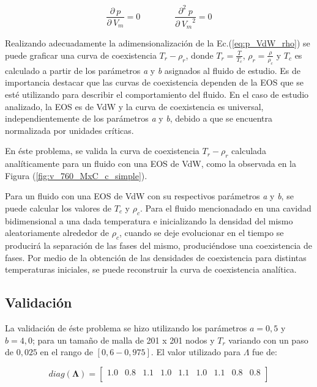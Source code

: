\begin{equation}
	\frac{\partial\> p}{\partial\> V_{m}} = 0 \qquad \qquad \frac{\partial^{2} \> p}{\partial\> {V_{m}}^{2}} = 0
	\label{eq:criterio_1_2_deriv}
\end{equation}

Realizando adecuadamente la adimensionalización  de la Ec.(\ref{eq:p_VdW_rho}) se puede graficar una curva de coexistencia $T_r - \rho_r$, donde $T_r = \frac{T}{T_c}$, $\rho_r = \frac{\rho}{\rho_c}$ y $T_c$ es calculado a partir de los parámetros \textit{a} y \textit{b} asignados al fluido de estudio. Es de importancia destacar que las curvas de coexistencia dependen de la EOS que se esté utilizando para describir el comportamiento del fluido. En el caso de estudio analizado, la EOS es de VdW y la curva de coexistencia es universal, independientemente de los parámetros \textit{a} y \textit{b}, debido a que se encuentra normalizada por unidades críticas.

En éste problema, se valida la curva de coexistencia $T_r - \rho_r$ calculada analíticamente para un fluido con una EOS de VdW, como la observada en la Figura (\ref{fig:v_760_MxC_c_simple}). 

Para un fluido con una EOS de VdW con su respectivos parámetros \textit{a} y \textit{b}, se puede calcular los valores de $T_c$ y $\rho_c$. Para  el fluido mencionadado en una cavidad bidimensional a una dada temperatura e inicializando la densidad del mismo aleatoriamente alrededor de  $\rho_c$, cuando se deje evolucionar en el tiempo se producirá la separación de las fases del mismo, produciéndose una coexistencia de fases. Por medio de la obtención de las densidades de coexistencia para distintas temperaturas iniciales, se puede reconstruir la curva de coexistencia analítica.

\subsection{Validación}

La validación de éste problema se hizo utilizando los parámetros $a =0,5$ y $b = 4,0$; para un tamaño de malla de 201 x 201 nodos y $T_r$ variando con un paso de $0,025$ en el rango de $[0,6 - 0,975]$.  El valor utilizado para $\Lambda$ fue de:

\begin{equation}
diag(\mathbf{\Lambda}) = 
\begin{bmatrix}
1.0 & 0.8 & 1.1 & 1.0 & 1.1 & 1.0 & 1.1 & 0.8 & 0.8 \\
\end{bmatrix}
\end{equation}

